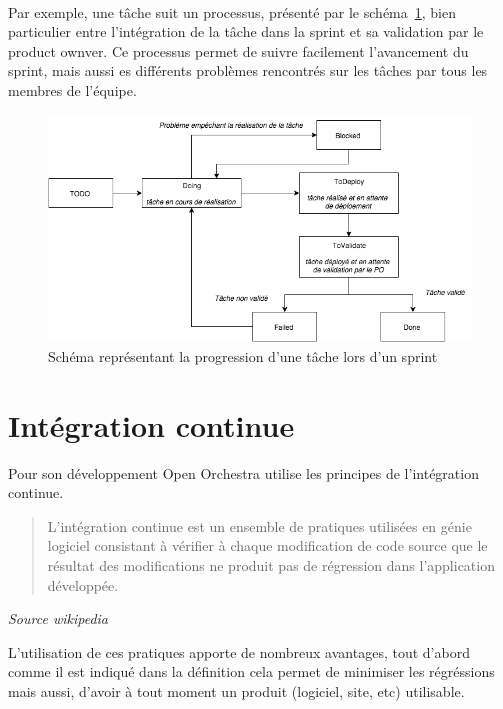 \paragraph{}
Par exemple, une tâche suit un processus, présenté par le schéma~\ref{tache_trello}, bien particulier entre l'intégration de la tâche dans la sprint et sa validation par le product ownver. Ce processus permet de suivre facilement l'avancement du sprint, mais aussi es différents problèmes rencontrés sur les tâches par tous les membres de l'équipe.

\begin{figure}[H]
  \begin{center}
    \includegraphics[scale=0.70]{images/tache_trello}
  \end{center}
  \caption{Schéma représentant la progression d'une tâche lors d'un sprint}
  \label{tache_trello}
\end{figure}
\section{Intégration continue}
Pour son développement Open Orchestra utilise les principes de l'intégration continue. 
\newline
\begin{quotation}
L'intégration continue est un ensemble de pratiques utilisées en génie logiciel consistant à vérifier à chaque modification de code source que le résultat des modifications ne produit pas de régression dans l'application développée.
\end{quotation}
\begin{center}
\textit{Source wikipedia}
\end{center}
\hfill \break
L'utilisation de ces pratiques apporte de nombreux avantages, tout d'abord comme il est indiqué dans la définition cela permet de minimiser les régréssions mais aussi, d'avoir à tout moment un produit (logiciel, site, etc) utilisable.
